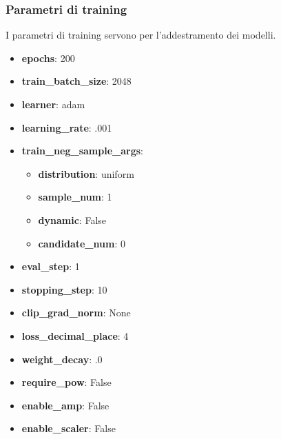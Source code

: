 \subsubsection*{Parametri di training}
I parametri di training servono per l'addestramento dei modelli.
\begin{itemize}
    \item \textbf{epochs}: 200
    \item \textbf{train\_batch\_size}: 2048
    \item \textbf{learner}: adam
    \item \textbf{learning\_rate}: .001
    \item \textbf{train\_neg\_sample\_args}: 
    \begin{itemize}
        \item \textbf{distribution}: uniform
        \item \textbf{sample\_num}: 1
        \item \textbf{dynamic}: False
        \item \textbf{candidate\_num}: 0
    \end{itemize}
    \item \textbf{eval\_step}: 1
    \item \textbf{stopping\_step}: 10
    \item \textbf{clip\_grad\_norm}: None
    \item \textbf{loss\_decimal\_place}: 4
    \item \textbf{weight\_decay}: .0
    \item \textbf{require\_pow}: False
    \item \textbf{enable\_amp}: False
    \item \textbf{enable\_scaler}: False
\end{itemize}

